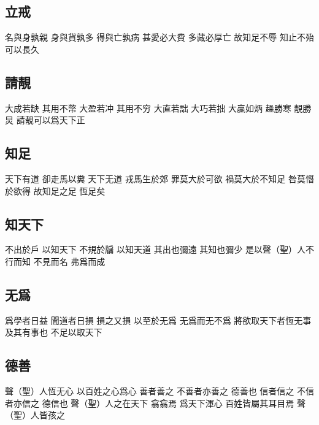 \documentclass[a5paper,zihao=-4,oneside,UTF8]{ctexart}
\begin{document}
\subsection{立戒}



名與身孰親 身與貨孰多 得與亡孰病 
甚愛必大費 多藏必厚亡 
故知足不辱 知止不殆 可以長久  



\subsection{請靚}



大成若缺 其用不幣 大盈若冲 其用不穷 大直若詘 大巧若拙 大贏如炳 
趮勝寒 靚勝炅 請靚可以爲天下正 



\subsection{知足}



天下有道 卻走馬以糞 天下无道 戎馬生於郊 
罪莫大於可欲 禍莫大於不知足 咎莫憯於欲得 
故知足之足 恆足矣




\subsection{知天下}



不出於戶 以知天下 不規於牖 以知天道 
其出也彌遠 其知也彌少 
是以聲（聖）人不行而知 不見而名 弗爲而成




\subsection{无爲}



爲學者日益 聞道者日損 損之又損 以至於无爲 无爲而无不爲 
將欲取天下者恆无事 及其有事也 不足以取天下 



\subsection{德善}



聲（聖）人恆无心 以百姓之心爲心 
善者善之 不善者亦善之 德善也 
信者信之 不信者亦信之 德信也 
聲（聖）人之在天下 翕翕焉 爲天下渾心 百姓皆屬其耳目焉 聲（聖）人皆孩之 
\end{document}
